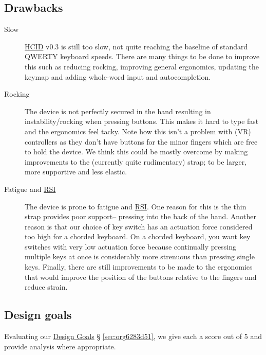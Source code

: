 \documentclass[logo,bsc,singlespacing,parskip]{infthesis}
\begin{document}
\subsection{Drawbacks}
\label{sec:org75decbf}
\begin{description}
\item[{Slow}] \hyperref[orgf95a76e]{HCID} v0.3 is still too slow, not quite reaching the baseline of standard QWERTY keyboard speeds.
There are many things to be done to improve this such as reducing rocking, improving general ergonomics, updating the keymap and adding whole-word input and autocompletion.

\item[{Rocking}] The device is not perfectly secured in the hand resulting in instability/rocking when pressing buttons.
This makes it hard to type fast and the ergonomics feel tacky.
Note how this isn't a problem with (VR) controllers as they don't have buttons for the minor fingers which are free to hold the device.
We think this could be mostly overcome by making improvements to the (currently quite rudimentary) strap; to be larger, more supportive and less elastic.

\item[{Fatigue and \hyperref[org503fc2d]{RSI}}] The device is prone to fatigue and \hyperref[org503fc2d]{RSI}.
One reason for this is the thin strap provides poor support-- pressing into the back of the hand.
Another reason is that our choice of key switch has an actuation force considered too high for a chorded keyboard.
On a chorded keyboard, you want key switches with very low actuation force because continually pressing multiple keys at once is considerably more strenuous than pressing single keys.
Finally, there are still improvements to be made to the ergonomics that would improve the position of the buttons relative to the fingers and reduce strain.
\end{description}
\subsection{Design goals}
\label{sec:org69e702d}
Evaluating our \hyperref[sec:org6283d51]{Design Goals} § \ref{sec:org6283d51}, we give each a score out of 5 and provide analysis where appropriate. \smallskip
\end{document}
